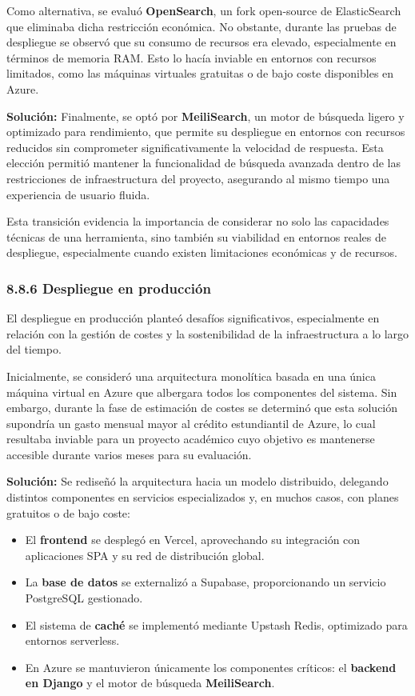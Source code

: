 Como alternativa, se evaluó \textbf{OpenSearch}, un fork open-source de ElasticSearch que eliminaba dicha restricción económica. No obstante, durante las pruebas de despliegue se observó que su consumo de recursos era elevado, especialmente en términos de memoria RAM. Esto lo hacía inviable en entornos con recursos limitados, como las máquinas virtuales gratuitas o de bajo coste disponibles en Azure.

\textbf{Solución:} Finalmente, se optó por \textbf{MeiliSearch}, un motor de búsqueda ligero y optimizado para rendimiento, que permite su despliegue en entornos con recursos reducidos sin comprometer significativamente la velocidad de respuesta. Esta elección permitió mantener la funcionalidad de búsqueda avanzada dentro de las restricciones de infraestructura del proyecto, asegurando al mismo tiempo una experiencia de usuario fluida.

Esta transición evidencia la importancia de considerar no solo las capacidades técnicas de una herramienta, sino también su viabilidad en entornos reales de despliegue, especialmente cuando existen limitaciones económicas y de recursos.
\subsubsection{8.8.6 Despliegue en producción}

El despliegue en producción planteó desafíos significativos, especialmente en relación con la gestión de costes y la sostenibilidad de la infraestructura a lo largo del tiempo.

Inicialmente, se consideró una arquitectura monolítica basada en una única máquina virtual en Azure que albergara todos los componentes del sistema. Sin embargo, durante la fase de estimación de costes se determinó que esta solución supondría un gasto mensual mayor al crédito estundiantil de Azure, lo cual resultaba inviable para un proyecto académico cuyo objetivo es mantenerse accesible durante varios meses para su evaluación.

\textbf{Solución:} Se rediseñó la arquitectura hacia un modelo distribuido, delegando distintos componentes en servicios especializados y, en muchos casos, con planes gratuitos o de bajo coste:
\begin{itemize}
    \item El \textbf{frontend} se desplegó en Vercel, aprovechando su integración con aplicaciones SPA y su red de distribución global.
    \item La \textbf{base de datos} se externalizó a Supabase, proporcionando un servicio PostgreSQL gestionado.
    \item El sistema de \textbf{caché} se implementó mediante Upstash Redis, optimizado para entornos serverless.
    \item En Azure se mantuvieron únicamente los componentes críticos: el \textbf{backend en Django} y el motor de búsqueda \textbf{MeiliSearch}.
\end{itemize}


